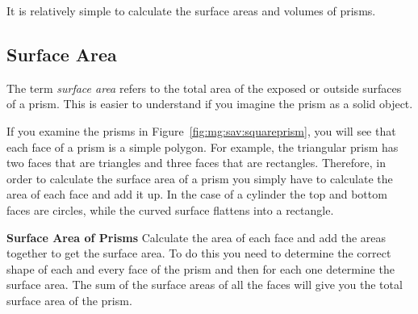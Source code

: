 \documentclass[10pt,a4paper,titlepage,twoside,openright]{report}
\begin{document}
It is relatively simple to calculate the surface areas and volumes of prisms. 

\subsection{Surface Area}
The term \textit{surface area} refers to the total area of the exposed or outside surfaces of a prism. This is easier to understand if you imagine the prism as a solid object. 

If you examine the prisms in Figure~\ref{fig:mg:sav:squareprism}, you will see that each face of a prism is a simple polygon. For example, the triangular prism has two faces that are triangles and three faces that are rectangles. Therefore, in order to calculate the surface area of a prism you simply have to calculate the area of each face and add it up. In the case of a cylinder the top and bottom faces are circles, while the curved surface flattens into a rectangle.

\textbf{Surface Area of Prisms}\newline
Calculate the area of each face and add the areas together to get the surface area. To do this you need to determine the correct shape of each and every face of the prism and then for each one determine the surface area. The sum of the surface areas of all the faces will give you the total surface area of the prism. 
\end{document}
